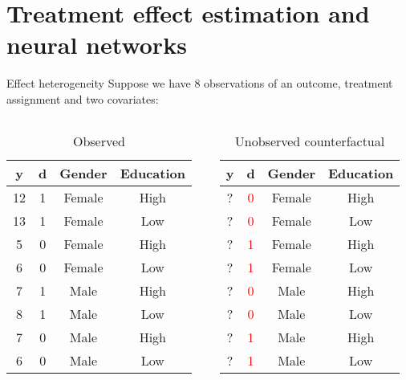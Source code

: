 \documentclass[
  ignorenonframetext,
]{beamer}
\begin{document}
\hypertarget{treatment-effect-estimation-and-neural-networks}{%
\section{Treatment effect estimation and neural
networks}\label{treatment-effect-estimation-and-neural-networks}}

\begin{frame}{Effect heterogeneity}
\protect\hypertarget{effect-heterogeneity}{}
Suppose we have 8 observations of an outcome, treatment assignment and
two covariates:

\vspace{1em}

\begin{columns}
\begin{column}{0.5\textwidth}
\begin{table}[]
    \begin{scriptsize}
\begin{tabular}{c|c|cc}
     \textbf{y} & \textbf{d} & \textbf{Gender} & \textbf{Education}  \\ \hline
     12 & 1 & Female & High \\
     13 & 1 & Female & Low\\
     5 & 0 & Female & High\\
     6 & 0 & Female & Low\\
     7 & 1 & Male & High\\
     8 & 1 & Male & Low\\
     7 & 0 & Male & High\\
     6 & 0 & Male & Low\\
\end{tabular}
\end{scriptsize}
    \caption{Observed}
\end{table}
\end{column}

\begin{column}{0.5\textwidth}
\begin{table}[]
    \begin{scriptsize}
\begin{tabular}{c|c|cc}
     \textbf{y} & \textbf{d} & \textbf{Gender} & \textbf{Education}  \\ \hline
     ? & \textcolor{red}{0} & Female & High \\
     ? & \textcolor{red}{0} & Female & Low\\
     ? & \textcolor{red}{1} & Female & High\\
     ? & \textcolor{red}{1} & Female & Low\\
     ? & \textcolor{red}{0} & Male & High\\
     ? & \textcolor{red}{0} & Male & Low\\
     ? & \textcolor{red}{1} & Male & High\\
     ? & \textcolor{red}{1} & Male & Low\\
\end{tabular}
\end{scriptsize}
    \caption{Unobserved counterfactual}
\end{table}
\end{column}
\end{columns}


\end{frame}
\end{document}
